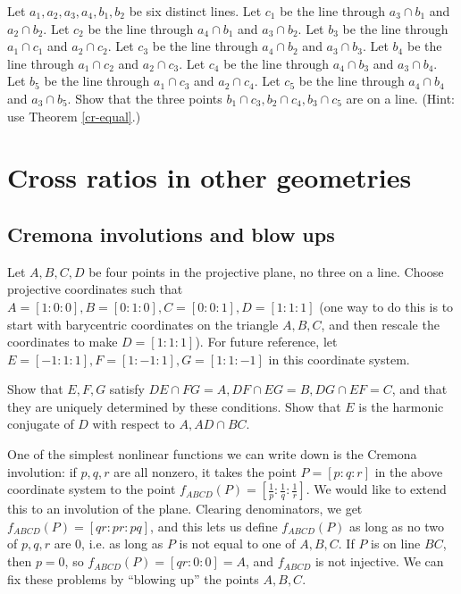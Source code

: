 \begin{exer} Let $a_1,a_2,a_3,a_4,b_1,b_2$ be six distinct lines. Let $c_1$ be the line through $a_3\cap b_1$ and $a_2\cap b_2$. Let $c_2$ be the line through $a_4\cap b_1$ and $a_3\cap b_2$. Let $b_3$ be the line through $a_1\cap c_1$ and $a_2\cap c_2$. Let $c_3$ be the line through $a_4\cap b_2$ and $a_3\cap b_3$. Let $b_4$ be the line through $a_1\cap c_2$ and $a_2\cap c_3$. Let $c_4$ be the line through $a_4\cap b_3$ and $a_3\cap b_4$. Let $b_5$ be the line through $a_1\cap c_3$ and $a_2\cap c_4$. Let $c_5$ be the line through $a_4\cap b_4$ and $a_3\cap b_5$. Show that the three points $b_1\cap c_3, b_2\cap c_4, b_3\cap c_5$ are on a line. (Hint: use Theorem \ref{cr-equal}.)
\end{exer}


\bigskip

\section{Cross ratios in other geometries}

\subsection{Cremona involutions and blow ups}


Let $A,B,C,D$ be four points in the projective plane, no three on a line. Choose projective coordinates such that $A = [1:0:0], B = [0:1:0], C = [0:0:1], D = [1:1:1]$ (one way to do this is to start with barycentric coordinates on the triangle $A,B,C$, and then rescale the coordinates to make $D = [1:1:1]$). For future reference, let $E = [-1:1:1], F = [1:-1:1], G = [1:1:-1]$ in this coordinate system.

\begin{exer} Show that $E,F,G$ satisfy $DE \cap FG = A, DF \cap EG = B, DG \cap EF = C$, and that they are uniquely determined by these conditions. Show that $E$ is the harmonic conjugate of $D$ with respect to $A, AD\cap BC$.
\end{exer}

One of the simplest nonlinear functions we can write down is the Cremona involution: if $p,q,r$ are all nonzero, it takes the point $P = [p:q:r]$ in the above coordinate system to the point $f_{ABCD}(P) = [\frac{1}{p}:\frac{1}{q}:\frac{1}{r}]$. We would like to extend this to an involution of the plane. Clearing denominators, we get $f_{ABCD}(P) = [qr:pr:pq]$, and this lets us define $f_{ABCD}(P)$ as long as no two of $p,q,r$ are $0$, i.e. as long as $P$ is not equal to one of $A,B,C$. If $P$ is on line $BC$, then $p=0$, so $f_{ABCD}(P) = [qr:0:0] = A$, and $f_{ABCD}$ is not injective. We can fix these problems by ``blowing up'' the points $A,B,C$.

